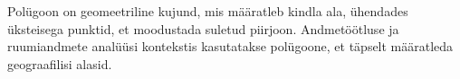 Polügoon on geomeetriline kujund, mis määratleb kindla ala, ühendades üksteisega
punktid, et moodustada suletud piirjoon. Andmetöötluse ja ruumiandmete analüüsi
kontekstis kasutatakse polügoone, et täpselt määratleda geograafilisi alasid. \cite{WhatLocationPolygon}

